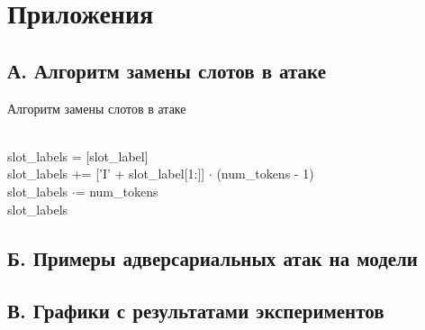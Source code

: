\section*{Приложения}

\subsection*{А. Алгоритм замены слотов в атаке}

\begin{algorithm}
    \caption{Алгоритм замены слотов в атаке}
    \begin{algorithmic}
            \\
            \ind slot\_labels = [slot\_label]
            \ind{}
                    \ind\ind{}
                                \\
                                \ind\ind\ind slot\_labels += ['I' + slot\_label[1:]] $\cdot$ (num\_tokens - 1)
                    \Else
                                \\
                                \ind\ind\ind slot\_labels $\cdot$= num\_tokens
                    \EndIf
            \EndIf \\
            \ind\Return slot\_labels
        \EndFunction
    \end{algorithmic}\label{alg:algorithm3}
\end{algorithm}

\newpage

\subsection*{Б. Примеры адверсариальных атак на модели}




\newpage

\subsection*{В. Графики с результатами экспериментов}

